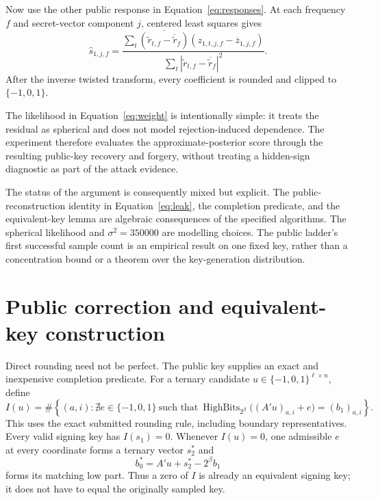 \documentclass[11pt]{article}
\newcommand{\HB}{\operatorname{HighBits}}
\begin{document}
Now use the other public response in Equation~\eqref{eq:responses}.  At each frequency $f$
and secret-vector component $j$, centered least squares gives
\begin{equation}
 \widehat s_{1,j,f}=
 \frac{\sum_t\overline{(\widetilde r_{t,f}-\overline{\widetilde r}_f)}
                   (z_{1,t,j,f}-\overline z_{1,j,f})}
      {\sum_t|\widetilde r_{t,f}-\overline{\widetilde r}_f|^2}.    \label{eq:sreg}
\end{equation}
After the inverse twisted transform, every coefficient is rounded and clipped to
$\{-1,0,1\}$.

The likelihood in Equation~\eqref{eq:weight} is intentionally simple: it treats the residual
as spherical and does not model rejection-induced dependence.  The experiment therefore
evaluates the approximate-posterior score through the resulting public-key recovery and forgery,
without treating a hidden-sign diagnostic as part of the attack evidence.

The status of the argument is consequently mixed but explicit.  The public-reconstruction
identity in Equation~\eqref{eq:leak}, the completion predicate, and the equivalent-key lemma
are algebraic consequences of the specified algorithms.  The spherical likelihood and
$\sigma^2=350000$ are modelling choices.  The public ladder's first successful sample count is
an empirical result on one fixed key, rather than a concentration bound or a theorem over the
key-generation distribution.

\section{Public correction and equivalent-key construction}
\label{sec:completion}

Direct rounding need not be perfect.  The public key supplies an exact and inexpensive
completion predicate.  For a ternary candidate $u\in\{-1,0,1\}^{\ell\times n}$, define
\begin{equation}
 I(u)=\#\left\{(a,i):
   \nexists e\in\{-1,0,1\}\ \text{such that}\
   \HB_{2^\beta}\bigl((A'u)_{a,i}+e\bigr)=(b_1)_{a,i}
 \right\}.                                                        \label{eq:invalid}
\end{equation}
This uses the exact submitted rounding rule, including boundary representatives.
Every valid signing key has $I(s_1)=0$.  Whenever $I(u)=0$, one admissible $e$ at every
coordinate forms a ternary vector $s_2^*$ and
\begin{equation}
  b_0^*=A'u+s_2^*-2^\beta b_1                                  \label{eq:equiv}
\end{equation}
forms its matching low part.  Thus a zero of $I$ is already an equivalent signing key; it
does not have to equal the originally sampled key.
\end{document}
